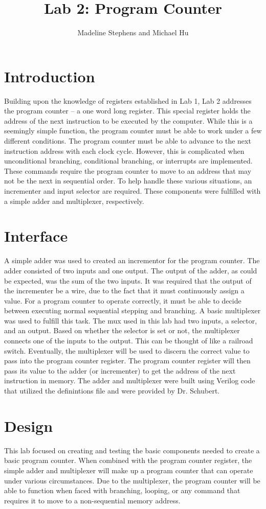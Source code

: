 \documentclass{article}
\author{Madeline Stephens and Michael Hu}
\title{Lab 2: Program Counter}
\begin{document}
\maketitle

\section{Introduction}
Building upon the knowledge of registers established in Lab 1, Lab 2 addresses the program counter -- a one word long register. This special register holds the address of the next instruction to be executed by the computer. While this is a seemingly simple function, the program counter must be able to work under a few different conditions. The program counter must be able to advance to the next instruction address with each clock cycle. However, this is complicated when unconditional branching, conditional branching, or interrupts are implemented. These commands require the program counter to move to an address that may not be the next in sequential order. To help handle these various situations, an incrementer and input selector are required. These components were fulfilled with a simple adder and multiplexer, respectively.

\section{Interface}
A simple adder was used to created an incrementor for the program counter. The adder consisted of two inputs and one output. The output of the adder, as could be expected, was the sum of the two inputs. It was required that the output of the incrementer be a wire, due to the fact that it must continuously assign a value. For a program counter to operate correctly, it must be able to decide between executing normal sequential stepping and branching. A basic multiplexer was used to fulfill this task. The mux used in this lab had two inputs, a selector, and an output. Based on whether the selector is set or not, the multiplexer connects one of the inputs to the output. This can be thought of like a railroad switch. Eventually, the multiplexer will be used to discern the correct value to pass into the program counter register. The program counter register will then pass its value to the adder (or incrementer) to get the address of the next instruction in memory. The adder and multiplexer were built using Verilog code that utilized the definintions file and were provided by Dr. Schubert. 


\section{Design}
This lab focused on creating and testing the basic components needed to create a basic program counter. When combined with the program counter register, the simple adder and multiplexer will make up a program counter that can operate under various circumstances. Due to the multiplexer, the program counter will be able to function when faced with branching, looping, or any command that requires it to move to a non-sequential memory address.  
\end{document}
